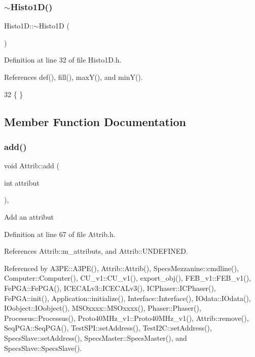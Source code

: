 \subsubsection{\texorpdfstring{$\sim$\+Histo1\+D()}{~Histo1D()}}
{\footnotesize\ttfamily Histo1\+D\+::$\sim$\+Histo1D (\begin{DoxyParamCaption}{ }\end{DoxyParamCaption})\hspace{0.3cm}{\ttfamily [inline]}}



Definition at line 32 of file Histo1\+D.\+h.



References def(), fill(), max\+Y(), and min\+Y().


\begin{DoxyCode}
32 \{ \}
\end{DoxyCode}


\subsection{Member Function Documentation}
\mbox{\label{classAttrib_a235f773af19c900264a190b00a3b4ad7}} 
\subsubsection{\texorpdfstring{add()}{add()}}
{\footnotesize\ttfamily void Attrib\+::add (\begin{DoxyParamCaption}\item[{int}]{attribut }\end{DoxyParamCaption})\hspace{0.3cm}{\ttfamily [inline]}, {\ttfamily [inherited]}}

Add an attribut 

Definition at line 67 of file Attrib.\+h.



References Attrib\+::m\+\_\+attributs, and Attrib\+::\+U\+N\+D\+E\+F\+I\+N\+ED.



Referenced by A3\+P\+E\+::\+A3\+P\+E(), Attrib\+::\+Attrib(), Specs\+Mezzanine\+::cmdline(), Computer\+::\+Computer(), C\+U\+\_\+v1\+::\+C\+U\+\_\+v1(), export\+\_\+obj(), F\+E\+B\+\_\+v1\+::\+F\+E\+B\+\_\+v1(), Fe\+P\+G\+A\+::\+Fe\+P\+G\+A(), I\+C\+E\+C\+A\+Lv3\+::\+I\+C\+E\+C\+A\+Lv3(), I\+C\+Phaser\+::\+I\+C\+Phaser(), Fe\+P\+G\+A\+::init(), Application\+::initialize(), Interface\+::\+Interface(), I\+Odata\+::\+I\+Odata(), I\+Oobject\+::\+I\+Oobject(), M\+S\+Oxxxx\+::\+M\+S\+Oxxxx(), Phaser\+::\+Phaser(), Processus\+::\+Processus(), Proto40\+M\+Hz\+\_\+v1\+::\+Proto40\+M\+Hz\+\_\+v1(), Attrib\+::remove(), Seq\+P\+G\+A\+::\+Seq\+P\+G\+A(), Test\+S\+P\+I\+::set\+Address(), Test\+I2\+C\+::set\+Address(), Specs\+Slave\+::set\+Address(), Specs\+Master\+::\+Specs\+Master(), and Specs\+Slave\+::\+Specs\+Slave().


